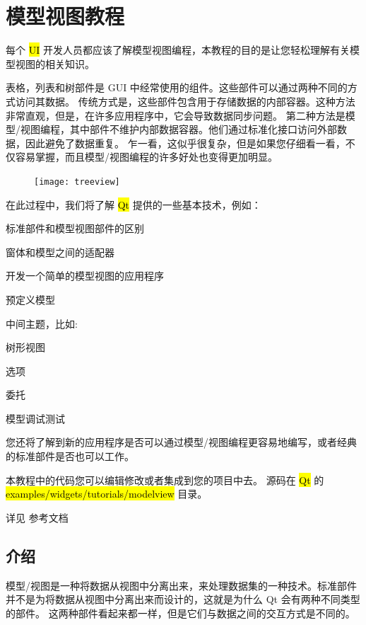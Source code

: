 \chapter{模型视图教程}

每个 \hl{UI} 开发人员都应该了解模型视图编程，本教程的目的是让您轻松理解有关模型视图的相关知识。

表格，列表和树部件是 GUI 中经常使用的组件。这些部件可以通过两种不同的方式访问其数据。
传统方式是，这些部件包含用于存储数据的内部容器。这种方法非常直观，但是，在许多应用程序中，它会导致数据同步问题。
第二种方法是模型/视图编程，其中部件不维护内部数据容器。他们通过标准化接口访问外部数据，因此避免了数据重复。
乍一看，这似乎很复杂，但是如果您仔细看一看，不仅容易掌握，而且模型/视图编程的许多好处也变得更加明显。

\begin{figure}[hbt!]  
\texttt{[image: treeview]}
\end{figure}

在此过程中，我们将了解 \hl{Qt} 提供的一些基本技术，例如：

\begin{compactitem}
\item 标准部件和模型视图部件的区别
\item 窗体和模型之间的适配器
\item 开发一个简单的模型视图的应用程序
\item 预定义模型
\item 中间主题，比如:
\begin{compactitem}
\item 树形视图
\item 选项
\item 委托
\item 模型调试测试
\end{compactitem}
\end{compactitem}

您还将了解到新的应用程序是否可以通过模型/视图编程更容易地编写，或者经典的标准部件是否也可以工作。

本教程中的代码您可以编辑修改或者集成到您的项目中去。 
源码在 \hl{Qt} 的 \hl{examples/widgets/tutorials/modelview} 目录。

详见 参考文档

\section{介绍}

模型/视图是一种将数据从视图中分离出来，来处理数据集的一种技术。标准部件并不是为将数据从视图中分离出来而设计的，这就是为什么 Qt 会有两种不同类型的部件。
这两种部件看起来都一样，但是它们与数据之间的交互方式是不同的。

